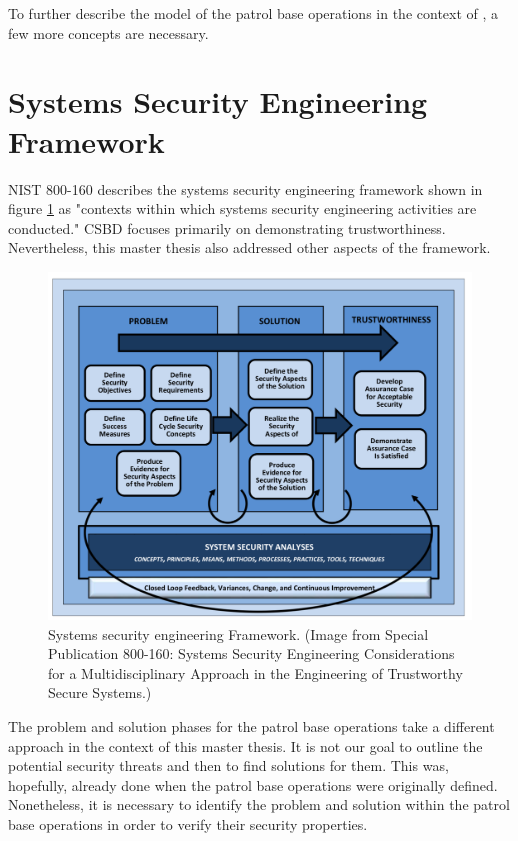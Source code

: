 \documentclass[../../main/main.tex]{subfiles}
\begin{document}
To further describe the model of the patrol base operations in the context of , a few more concepts are necessary.  

\section{Systems Security Engineering Framework}\label{sssec:sseframework}
NIST 800-160 describes the systems security engineering framework shown in figure \ref{sseframework} as "contexts within which systems security engineering activities are conducted."  CSBD focuses primarily on demonstrating trustworthiness.  Nevertheless, this master thesis also addressed other aspects of the framework.  

\begin{figure}[h]
\includegraphics[width=\linewidth]{../figures/sseframework}
\caption{\label{sseframework}Systems security engineering Framework. (Image from  Special Publication 800-160: Systems Security Engineering Considerations for a Multidisciplinary Approach in the Engineering of Trustworthy Secure Systems.)}
\end{figure}

The problem and solution phases for the patrol base operations take a different approach in the context of this master thesis. It is not our goal to outline the potential security threats and then to find solutions for them.  This was, hopefully, already done when the patrol base operations were originally defined.  Nonetheless, it is necessary to identify the problem and solution within the patrol base operations in order to verify their security properties.  
\end{document}

